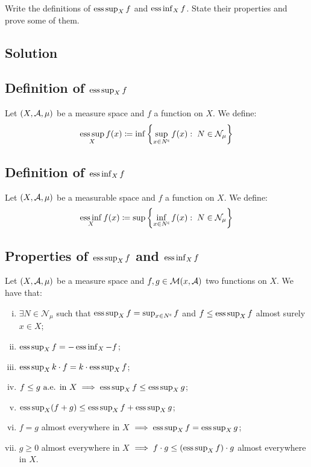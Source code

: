 

\question

Write the definitions of $\operatorname*{ess\,sup}_X f$ and $\operatorname*{ess\,inf}_X f$. State their properties and prove some of them.

\subsection*{Solution}

\subsection{Definition of \texorpdfstring{$\operatorname*{ess\,sup}_X f$}{essup f}}
Let $(X, \mathcal{A}, \mu)$ be a measure space and $f$ a function on $X$. We define:
\[
    \operatorname*{ess\,sup}_X f(x) \coloneqq \inf \left\{ \sup_{x\in N^{\mathsf{c}}} f(x) : \; N \in \mathcal{N}_{\mu} \right\}
\]

\subsection{Definition of \texorpdfstring{$\operatorname*{ess\,inf}_X f$}{essinf f}}
Let $(X, \mathcal{A}, \mu)$ be a measurable space and $f$ a function on $X$. We define:
\[
    \operatorname*{ess\,inf}_X f(x) \coloneqq \sup \left\{ \inf_{x\in N^{\mathsf{c}}} f(x) : \; N \in \mathcal{N}_{\mu} \right\}
\]

\subsection{Properties of \texorpdfstring{$\operatorname*{ess\,sup}_X f$}{essup f} and \texorpdfstring{$\operatorname*{ess\,inf}_X f$}{essinf f}}
Let $(X, \mathcal{A}, \mu)$ be a measure space and $f,g\in\mathcal{M}(x,\mathcal{A})$ two functions on $X$. We have that:
\begin{enumerate}[i)]
    \item $\exists N \in \mathcal{N}_\mu$ such that $\operatorname*{ess\,sup}_X f = \sup_{x\in N^{\mathsf{c}}} f$ and $f\leq \operatorname*{ess\,sup}_X f$ almost surely $x\in X$;
    \item $\operatorname*{ess\,sup}_X f = -\operatorname*{ess\,inf}_X -f$;
    \item $\operatorname*{ess\,sup}_X k\cdot f  = k \cdot \operatorname*{ess\,sup}_X f$;
    \item $f\leq g \text{ a.e. in } X \implies \operatorname*{ess\,sup}_X f \leq \operatorname*{ess\,sup}_X g$;
    \item $\operatorname*{ess\,sup}_X (f+g) \leq \operatorname*{ess\,sup}_X f + \operatorname*{ess\,sup}_X g$;
    \item $f = g$ almost everywhere in $X$ $\implies \operatorname*{ess\,sup}_X f = \operatorname*{ess\,sup}_X g$;
    \item $g \geq 0$ almost everywhere in $X$ $\implies f\cdot g \leq (\operatorname*{ess\,sup}_X f)\cdot g$ almost everywhere in $X$.
\end{enumerate}

